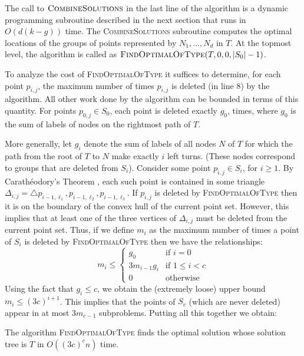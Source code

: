 \documentclass[lotsofwhite]{patmorin}
\begin{document}
The call to $\textsc{CombineSolutions}$ in the last line of the
algorithm is a dynamic programming subroutine described in the next
section that runs in $O(d(k-g))$ time.  The \textsc{CombineSolutions}
subroutine computes the optimal locations of the groups of points
represented by $N_1,\ldots,N_d$ in $T$.  At the topmost level, the
algorithm is called as $\textsc{FindOptimalOfType}(T,0,0,|S_0|-1)$.

To analyze the cost of \textsc{FindOptimalOfType} it suffices to
determine, for each point $p_{i,j}$, the maximum number of times
$p_{i,j}$ is deleted (in line 8) by the algorithm.  All other work
done by the algorithm can be bounded in terms of this quantity.  For
points $p_{0,j}\in S_0$, each point is deleted exactly $g_0$, times,
where $g_0$ is the sum of labels of nodes on the rightmost path of
$T$. 

More generally, let $g_i$ denote the sum of labels of all nodes $N$ of
$T$ for which the path from the root of $T$ to $N$ make exactly $i$
left turns. (These nodes correspond to groups that are deleted from
$S_i$).  Consider some point $p_{i,j}\in S_i$, for $i\ge 1$.  By
Carath\'eodory's Theorem \cite{eckhoff93}, each such point is contained
in some triangle $\Delta_{i,j}=\triangle
p_{i-1,\ell_1},p_{i-1,\ell_2},p_{i-1,\ell_3}$. If $p_{i,j}$ is deleted
by \textsc{FindOptimalOfType} then it is on the boundary of the convex
hull of the current point set.  However, this implies that at least
one of the three vertices of $\Delta_{i,j}$ must be deleted from the
current point set.  Thus, if we define $m_i$ as the maximum number of
times a point of $S_i$ is deleted by \textsc{FindOptimalOfType} then
we have the relationships:
\[ 
    m_i \le \left\{\begin{array}{ll}
            g_0 & \mbox{if $i=0$} \\
            3 m_{i-1} g_i & \mbox{if $1\le i< c$} \\
            0 & \mbox{otherwise}      
        \end{array}\right.
\] 
Using the fact that $g_i \le c$, we obtain the (extremely loose) upper
bound $m_i \le (3c)^{i+1}$.  
This implies that the points of $S_c$
(which are never deleted) appear in at most $3m_{c-1}$ subproblems.
Putting all this together we obtain:

\begin{lem}
The algorithm \textsc{FindOptimalOfType} finds the optimal solution
whose solution tree is $T$ in $O((3c)^c n)$ time.
\end{lem}
\end{document}
